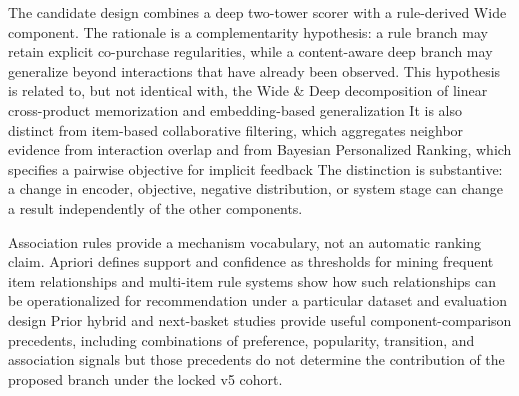 The candidate design combines a deep two-tower scorer with a rule-derived Wide
component. The rationale is a complementarity hypothesis: a rule branch may
retain explicit co-purchase regularities, while a content-aware deep branch may
generalize beyond interactions that have already been observed. This hypothesis
is related to, but not identical with, the Wide \& Deep decomposition of linear
cross-product memorization and embedding-based generalization
\cite{cheng2016_wide_deep} %
It is also distinct from item-based collaborative filtering, which aggregates
neighbor evidence from interaction overlap
\cite{sarwar2001_itemcf} %
and from Bayesian Personalized Ranking, which specifies a pairwise objective
for implicit feedback
\cite{rendle2009_bpr} %
The distinction is substantive: a change in encoder, objective, negative
distribution, or system stage can change a result independently of the other
components.

Association rules provide a mechanism vocabulary, not an automatic ranking
claim. Apriori defines support and confidence as thresholds for mining frequent
item relationships
\cite{agrawal1994_apriori} %
and multi-item rule systems show how such relationships can be operationalized
for recommendation under a particular dataset and evaluation design
\cite{ghoshal2014_multi_item_rules} %
Prior hybrid and next-basket studies provide useful component-comparison
precedents, including combinations of preference, popularity, transition, and
association signals
\cite{liu2009_hybrid_seq_cf} %
\cite{peng2022_ham} %
\cite{peng2023_m2} %
but those precedents do not determine the contribution of the proposed branch
under the locked v5 cohort.

